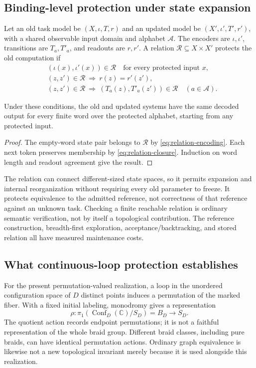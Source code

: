 \subsection{Binding-level protection under state expansion}

Let an old task model be $(X,\iota,T,r)$ and an updated model be
$(X',\iota',T',r')$, with a shared observable input domain and alphabet
$\mathcal A$. The encoders are $\iota,\iota'$, transitions are
$T_a,T'_a$, and readouts are $r,r'$. A relation
$\mathcal R\subseteq X\times X'$ protects the old computation if
\begin{align}
 &(\iota(x),\iota'(x))\in\mathcal R\quad\text{for every protected input }x,
 \label{eq:relation-encoding}\\
 &(z,z')\in\mathcal R\ \Longrightarrow\ r(z)=r'(z'),\\
 &(z,z')\in\mathcal R\ \Longrightarrow\
       (T_a(z),T'_a(z'))\in\mathcal R\quad(a\in\mathcal A).
 \label{eq:relation-closure}
\end{align}
\begin{proposition}
Under these conditions, the old and updated systems have the same decoded
output for every finite word over the protected alphabet, starting from any
protected input.
\end{proposition}
\begin{proof}
The empty-word state pair belongs to $\mathcal R$ by
\eqref{eq:relation-encoding}. Each next token preserves membership by
\eqref{eq:relation-closure}. Induction on word length and readout agreement
give the result.
\end{proof}

The relation can connect different-sized state spaces, so it permits expansion
and internal reorganization without requiring every old parameter to freeze.
It protects equivalence to the admitted reference, not correctness of that
reference against an unknown task. Checking a finite reachable relation is
ordinary semantic verification, not by itself a topological contribution.
The reference construction, breadth-first exploration, acceptance/backtracking,
and stored relation all have measured maintenance costs.

\subsection{What continuous-loop protection establishes}

For the present permutation-valued realization, a loop in the unordered
configuration space of $D$ distinct points induces a permutation of the marked
fiber. With a fixed initial labeling, monodromy gives a representation
\begin{equation}
 \rho:\pi_1\!\left(\operatorname{Conf}_D(\mathbb C)/S_D\right)
       =B_D\longrightarrow S_D.
 \label{eq:permutation-monodromy}
\end{equation}
The quotient action records endpoint permutations; it is not a faithful
representation of the whole braid group. Different braid classes, including
pure braids, can have identical permutation actions. Ordinary graph equivalence
is likewise not a new topological invariant merely because it is used alongside
this realization.

